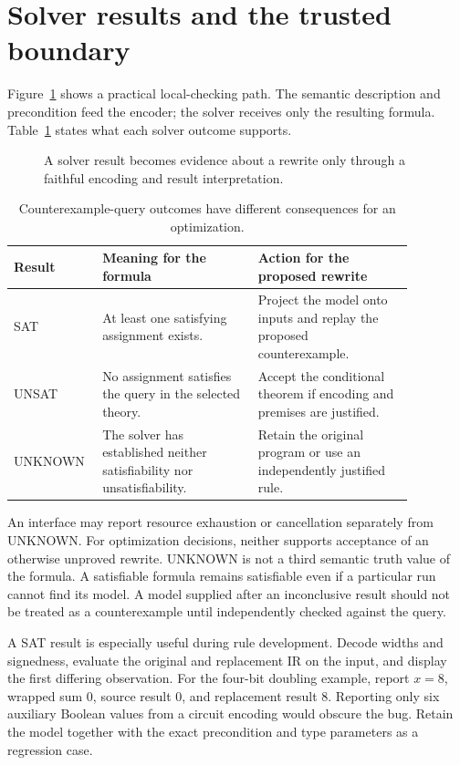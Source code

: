 \section{Solver results and the trusted boundary}
\label{sec:ch41-results}

Figure~\ref{fig:ch41-checker-pipeline} shows a practical local-checking path.
The semantic description and precondition feed the encoder; the solver receives only the resulting formula.
Table~\ref{tab:ch41-outcomes} states what each solver outcome supports.

\begin{figure}
\centering

\caption{A solver result becomes evidence about a rewrite only through a faithful encoding and result interpretation.}
\label{fig:ch41-checker-pipeline}
\end{figure}

\begin{table}
\caption{Counterexample-query outcomes have different consequences for an optimization.}
\label{tab:ch41-outcomes}
\centering
\begin{tabular}{p{0.15\linewidth}p{0.36\linewidth}p{0.36\linewidth}}
\toprule
Result & Meaning for the formula & Action for the proposed rewrite \\
\midrule
SAT & At least one satisfying assignment exists. & Project the model onto inputs and replay the proposed counterexample. \\
UNSAT & No assignment satisfies the query in the selected theory. & Accept the conditional theorem if encoding and premises are justified. \\
UNKNOWN & The solver has established neither satisfiability nor unsatisfiability. & Retain the original program or use an independently justified rule. \\
\bottomrule
\end{tabular}
\end{table}

An interface may report resource exhaustion or cancellation separately from UNKNOWN.
For optimization decisions, neither supports acceptance of an otherwise unproved rewrite.
UNKNOWN is not a third semantic truth value of the formula.
A satisfiable formula remains satisfiable even if a particular run cannot find its model.
A model supplied after an inconclusive result should not be treated as a counterexample until independently checked against the query.

A SAT result is especially useful during rule development.
Decode widths and signedness, evaluate the original and replacement IR on the input, and display the first differing observation.
For the four-bit doubling example, report $x=8$, wrapped sum $0$, source result $0$, and replacement result $8$.
Reporting only six auxiliary Boolean values from a circuit encoding would obscure the bug.
Retain the model together with the exact precondition and type parameters as a regression case.

